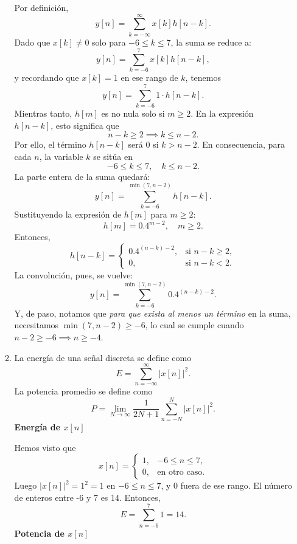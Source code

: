 \begin{enumerate}[label=\color{red}\textbf{\arabic*)}]
\begin{enumerate}[label=\color{red}\textbf{\alph*)}]
        Por definición, \[
            y[n]=\sum_{k=-\infty}^{\infty} x[k]h[n-k].
        \] 
        Dado que $x[k]\neq 0$ solo para $-6\le k\le 7$, la suma se reduce a: \[
            y[n]=\sum_{k=-6}^{7} x[k]h[n-k],
        \] y recordando que $x[k]=1$ en ese rango de  $k$, tenemos \[
        y[n]=\sum_{k=-6}^{7} 1\cdot h[n-k].
        \] 
        Mientras tanto, $h[m]$ es no nula solo si  $m\ge 2$. En la expresión $h[n-k]$, esto significa que  \[
        n-k\ge 2\implies k\le n-2.
        \] 
        Por ello, el término $h[n-k]$ será 0 si  $k>n-2$. En consecuencia, para cada  $n$, la variable  $k$ se sitúa en \[
        -6\le k\le 7,\quad k\le n-2.
        \] 
        La parte entera de la suma quedará: \[
            y[n]=\sum_{k=-6}^{\min(7,n-2)} h[n-k].
        \] 
        Sustituyendo la expresión de $h[m]$ para  $m\ge 2$: \[
            h[m]=0.4^{m-2},\quad m\ge 2.
        \] 
        Entonces, \[
            h[n-k]=\begin{cases}
                0.4^{(n-k)-2}, & \text{si }n-k\ge 2,\\
                0, & \text{si }n-k<2.
            \end{cases}
        \] 
        La convolución, pues, se vuelve: \[
            y[n]=\sum_{k=-6}^{\min(7,n-2)} 0.4^{(n-k)-2}.
        \] 
        Y, de paso, notamos que \textit{para que exista al menos un término} en la suma, necesitamos $\min(7,n-2)\ge -6$, lo cual se cumple cuando $n-2\ge -6\implies n\ge -4$.
    \item {} 

        La energía de una señal discreta se define como \[
            E=\sum_{n=-\infty}^{\infty} |x[n]|^2.
        \] 
        La potencia promedio se define como \[
            P=\lim_{N \to \infty} \dfrac{1}{2N+1}\sum_{n=-N}^{N} |x[n]|^2.
        \] 
        \textbf{Energía de $x[n]$} 

        Hemos visto que \[
            x[n]=\begin{cases}
                1, & -6\le n\le 7,\\
                0, & \text{en otro caso}.
            \end{cases}
        \] 
        Luego $|x[n]|^2=1^2=1$ en $-6\le n\le 7$, y 0 fuera de ese rango. El número de enteros entre -6 y 7 es 14. Entonces, \[
        E=\sum_{n=-6}^{7} 1=14.
        \] 
        \textbf{Potencia de $x[n]$} 


\end{enumerate}
\end{enumerate}
